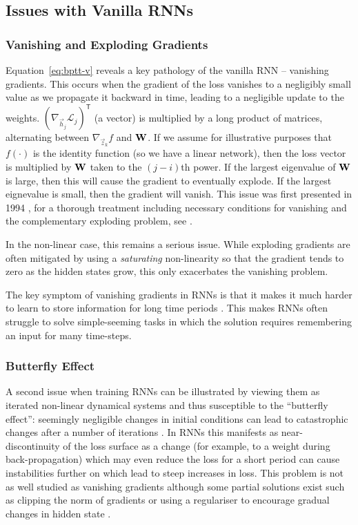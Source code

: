 \subsection{Issues with Vanilla RNNs}
\subsubsection{Vanishing and Exploding Gradients}
Equation~\eqref{eq:bptt-v} reveals a key pathology of the vanilla RNN -- vanishing gradients.
This occurs when the gradient of the loss vanishes to a negligibly small value as we
propagate it backward in time, leading to a negligible update to the weights.
 \((\nabla_{\vec{h}_j}\mathcal{L}_j)^\mathsf{T}\) (a vector) is multiplied by a long product of
 matrices, alternating between \(\nabla_{\vec{z}_k} f\) and \(\mathbf{W}\). If we assume for
 illustrative purposes that \(f(\cdot)\) is the identity function (so we have a linear network),
then the loss vector is multiplied by \(\mathbf{W}\) taken to the \((j-i)\)th power. If the largest
eigenvalue of \(\mathbf{W}\) is large, then this will cause the gradient to eventually explode.
If the largest eignevalue is small, then the gradient will vanish. This issue was first presented
in 1994 \autocite{Bengio1994}, for a thorough treatment including necessary conditions 
for vanishing and the complementary exploding problem, see \autocite{Pascanu2012}.

In the non-linear case, this remains a serious issue. While exploding gradients are often
mitigated by using a \emph{saturating} non-linearity so that the gradient tends to zero as the
hidden states grow, this only exacerbates the vanishing problem. 

The key symptom of vanishing gradients in RNNs is that it makes it much harder to learn to
store information for long time periods \autocite{Bengio1994}. This makes RNNs often struggle to
solve simple-seeming tasks in which the solution requires remembering an input for many
time-steps. 

\subsubsection{Butterfly Effect}
A second issue when training RNNs can be illustrated by viewing them as iterated non-linear	
dynamical systems and thus susceptible to the ``butterfly effect'': seemingly negligible changes
in initial conditions can lead to catastrophic changes after a number of iterations
\autocite{Lorenz1963}. In RNNs this manifests as near-discontinuity of the loss surface
\autocite{Pascanu2012} as a change (for example, to a weight during back-propagation) which may
even reduce the loss for a short period can cause instabilities further on which lead to steep
increases in loss. This problem is not as well studied as vanishing gradients although some
partial solutions exist such as clipping the norm of gradients \autocite{Pascanu2012} or
using a regulariser to encourage gradual changes in hidden state \autocite{Krueger2016}.


